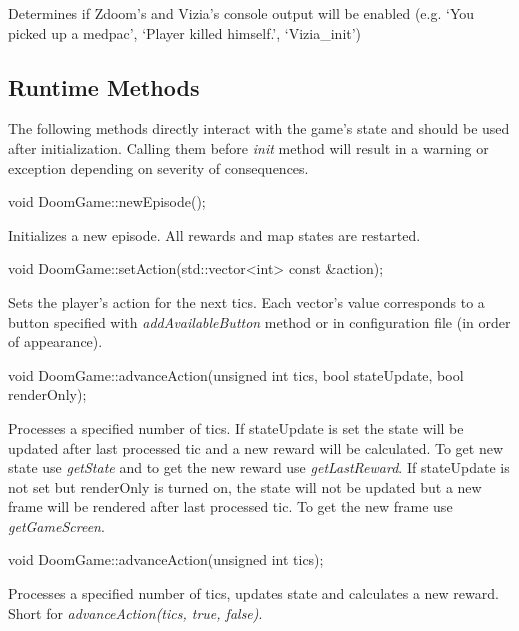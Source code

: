 	Determines if Zdoom's and Vizia's console output will be enabled (e.g. `You picked up a medpac', `Player killed himself.', `Vizia\_init')


\vspace{20pt}
\subsection{Runtime Methods}\label{subsec:runtime_methods}
	The following methods directly interact with the game's state and should be used after initialization. Calling them before \emph{init} method will result in a warning or exception depending on severity of consequences. 

\vspace{20pt}
\begin{clinee}
void DoomGame::newEpisode();
\end{clinee}

	Initializes a new episode. All rewards and map states are restarted.


\vspace{20pt}
\begin{clinee}
	void DoomGame::setAction(std::vector<int> const &action);
\end{clinee}

	Sets the player's action for the next tics.
	Each vector's value corresponds to a button specified with \emph{addAvailableButton} method or in configuration file (in order of appearance).


\vspace{20pt}
\begin{clinee}
	void DoomGame::advanceAction(unsigned int tics, bool stateUpdate, bool renderOnly);
\end{clinee}

    	Processes a specified number of tics. If stateUpdate is set the state will be updated after last processed tic and a new reward will be calculated. To get new state use \emph{getState} and to get the new reward use  \emph{getLastReward}. If stateUpdate is not set but renderOnly is turned on, the state will not be updated but a new frame will be rendered after last processed tic. To get the new frame use \emph{getGameScreen}.

\vspace{20pt}
\begin{clinee}
	void DoomGame::advanceAction(unsigned int tics);
\end{clinee}

    	Processes a specified number of tics, updates state and calculates a new reward. Short for \emph{advanceAction(tics, true, false)}.


